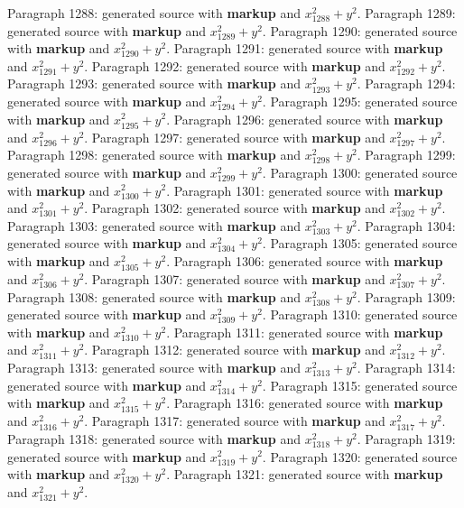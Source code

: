\documentclass{article}
\begin{document}
Paragraph 1288: generated source with \textbf{markup} and $x_{1288}^2 + y^2$.
Paragraph 1289: generated source with \textbf{markup} and $x_{1289}^2 + y^2$.
Paragraph 1290: generated source with \textbf{markup} and $x_{1290}^2 + y^2$.
Paragraph 1291: generated source with \textbf{markup} and $x_{1291}^2 + y^2$.
Paragraph 1292: generated source with \textbf{markup} and $x_{1292}^2 + y^2$.
Paragraph 1293: generated source with \textbf{markup} and $x_{1293}^2 + y^2$.
Paragraph 1294: generated source with \textbf{markup} and $x_{1294}^2 + y^2$.
Paragraph 1295: generated source with \textbf{markup} and $x_{1295}^2 + y^2$.
Paragraph 1296: generated source with \textbf{markup} and $x_{1296}^2 + y^2$.
Paragraph 1297: generated source with \textbf{markup} and $x_{1297}^2 + y^2$.
Paragraph 1298: generated source with \textbf{markup} and $x_{1298}^2 + y^2$.
Paragraph 1299: generated source with \textbf{markup} and $x_{1299}^2 + y^2$.
Paragraph 1300: generated source with \textbf{markup} and $x_{1300}^2 + y^2$.
Paragraph 1301: generated source with \textbf{markup} and $x_{1301}^2 + y^2$.
Paragraph 1302: generated source with \textbf{markup} and $x_{1302}^2 + y^2$.
Paragraph 1303: generated source with \textbf{markup} and $x_{1303}^2 + y^2$.
Paragraph 1304: generated source with \textbf{markup} and $x_{1304}^2 + y^2$.
Paragraph 1305: generated source with \textbf{markup} and $x_{1305}^2 + y^2$.
Paragraph 1306: generated source with \textbf{markup} and $x_{1306}^2 + y^2$.
Paragraph 1307: generated source with \textbf{markup} and $x_{1307}^2 + y^2$.
Paragraph 1308: generated source with \textbf{markup} and $x_{1308}^2 + y^2$.
Paragraph 1309: generated source with \textbf{markup} and $x_{1309}^2 + y^2$.
Paragraph 1310: generated source with \textbf{markup} and $x_{1310}^2 + y^2$.
Paragraph 1311: generated source with \textbf{markup} and $x_{1311}^2 + y^2$.
Paragraph 1312: generated source with \textbf{markup} and $x_{1312}^2 + y^2$.
Paragraph 1313: generated source with \textbf{markup} and $x_{1313}^2 + y^2$.
Paragraph 1314: generated source with \textbf{markup} and $x_{1314}^2 + y^2$.
Paragraph 1315: generated source with \textbf{markup} and $x_{1315}^2 + y^2$.
Paragraph 1316: generated source with \textbf{markup} and $x_{1316}^2 + y^2$.
Paragraph 1317: generated source with \textbf{markup} and $x_{1317}^2 + y^2$.
Paragraph 1318: generated source with \textbf{markup} and $x_{1318}^2 + y^2$.
Paragraph 1319: generated source with \textbf{markup} and $x_{1319}^2 + y^2$.
Paragraph 1320: generated source with \textbf{markup} and $x_{1320}^2 + y^2$.
Paragraph 1321: generated source with \textbf{markup} and $x_{1321}^2 + y^2$.
\end{document}
